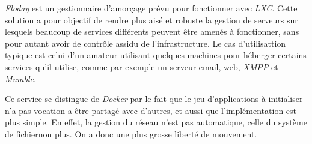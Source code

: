 \emph{Floday} est un gestionnaire d'amorçage prévu pour fonctionner avec \emph{LXC}.
Cette solution a pour objectif de rendre plus aisé et robuste la gestion de serveurs sur lesquels beaucoup de services différents peuvent être amenés à fonctionner, sans pour autant avoir de contrôle assidu de l'infrastructure.
Le cas d'utilisattion typique est celui d'un amateur utilisant quelques machines pour héberger certains services qu'il utilise, comme par exemple un serveur email, web, \emph{XMPP} et \emph{Mumble}.

Ce service se distingue de \emph{Docker} par le fait que le jeu d'applications à initialiser n'a pas vocation a être partagé avec d'autres, et aussi que l'implémentation est plus simple.
En effet, la gestion du réseau n'est pas automatique, celle du système de fichiernon plus.
On a donc une plus grosse liberté de mouvement.
